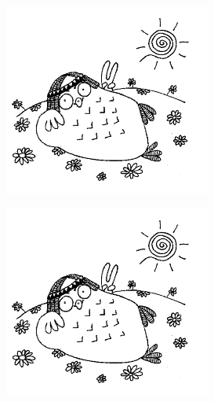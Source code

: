\documentclass[11pt,a5paper]{book}
\begin{document}
\newpage
\raggedright

\centering\includegraphics[scale=0.5]{10}

\newpage
\raggedright

\centering\includegraphics[scale=0.5]{10}
\end{document}
